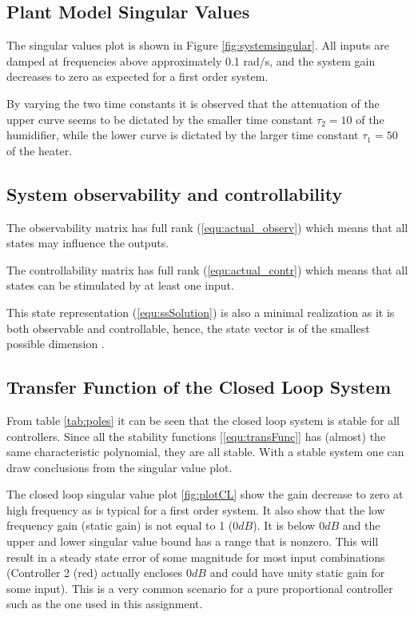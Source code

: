 \documentclass[a4paper, titlepage]{article}
\begin{document}
\subsection{Plant Model Singular Values}

The singular values plot is shown in Figure \ref{fig:systemsingular}.  All inputs are damped at frequencies above approximately 0.1 rad/s, and the system gain decreases to zero as expected for a first order system.

By varying the two time constants it is observed that the attenuation of the upper curve seems to be dictated by the smaller time constant $\tau_{2}=10$ of the humidifier, while the lower curve is dictated by the larger time constant $\tau_{1}=50$ of the heater. 

\subsection{System observability and controllability}

The observability matrix has full rank (\ref{equ:actual_observ}) which means that all states may influence the outputs.

The controllability matrix has full rank (\ref{equ:actual_contr}) which means that all states can be stimulated by at least one input.

This state representation (\ref{equ:ssSolution}) is also a minimal realization as it is both observable and controllable, hence, the state vector is of the smallest possible dimension \cite [p. 46]{glad00}.

\subsection{Transfer Function of the Closed Loop System}
From table \ref{tab:poles} it can be seen that the closed loop system is stable for all controllers. 
Since all the stability functions [\ref{equ:transFunc}] has (almost) the same characteristic polynomial, they are all stable.
With a stable system one can draw conclusions from the singular value plot.

The closed loop singular value plot \ref{fig:plotCL} show the gain decrease to zero at high frequency as is typical for a first order system.
It also show that the low frequency gain (static gain) is not equal to 1 ($0dB$).
It is below $0dB$ and the upper and lower singular value bound has a range that is nonzero.
This will result in a steady state error of some magnitude for most input combinations (Controller 2 (red) actually encloses $0dB$ and could have unity static gain for some input).
This is a very common scenario for a pure proportional controller such as the one used in this assignment.
\end{document}
